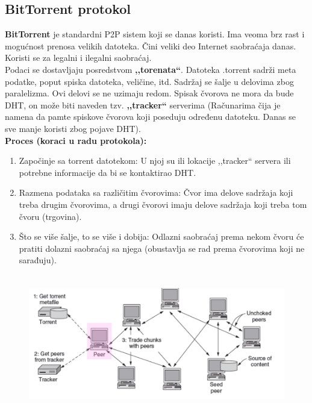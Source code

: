 \documentclass[a4paper]{article}
\begin{document}
    \subsection{BitTorrent protokol}
        \textbf{BitTorrent} je standardni P2P sistem koji se danas koristi. Ima veoma brz rast
        i mogućnost prenosa velikih datoteka. Čini veliki deo Internet saobraćaja danas. Koristi se
        za legalni i ilegalni saobraćaj.\\
        \indent Podaci se dostavljaju posredstvom \textbf{,,torenata``}. Datoteka .torrent sadrži
        meta podatke, poput spiska datoteka, veličine, itd. Sadržaj se šalje u delovima zbog 
        paralelizma. Ovi delovi se ne uzimaju redom. Spisak čvorova ne mora da bude DHT, on može
        biti naveden tzv. \textbf{,,tracker``} serverima (Računarima čija je namena da pamte spiskove
        čvorova koji poseduju određenu datoteku. Danas se sve manje koristi zbog pojave DHT).\\
        \textbf{Proces (koraci u radu protokola):}
        \begin{enumerate}
            \item Započinje sa torrent datotekom: U njoj su ili lokacije ,,tracker`` servera
                  ili potrebne informacije da bi se kontaktirao DHT.
            \item Razmena podataka sa različitim čvorovima: Čvor ima delove sadržaja koji
                  treba drugim čvorovima, a drugi čvorovi imaju delove sadržaja koji treba
                  tom čvoru (trgovina).
            \item Što se više šalje, to se više i dobija: Odlazni saobraćaj prema nekom čvoru
                  će pratiti dolazni saobraćaj sa njega (obustavlja se rad prema čvorovima
                  koji ne sarađuju). 
        \end{enumerate}
        \begin{figure}[H]
            \begin{center}
                \includegraphics[width=120mm,height=60mm]{Slike/p2p2.png}
            \end{center}
        \end{figure}



\newpage
        
\appendix
\end{document}
